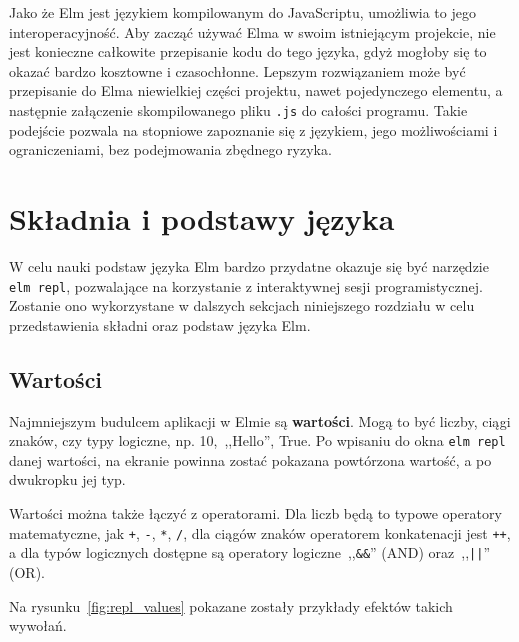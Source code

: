 \documentclass[twoside,a4paper]{report}
\begin{document}
Jako że Elm jest językiem kompilowanym do JavaScriptu, umożliwia to jego interoperacyjność.
Aby zacząć używać Elma w swoim istniejącym projekcie, nie jest konieczne całkowite przepisanie kodu do tego języka, gdyż mogłoby się to okazać bardzo kosztowne i czasochłonne.
Lepszym rozwiązaniem może być przepisanie do Elma niewielkiej części projektu, nawet pojedynczego elementu, a następnie załączenie skompilowanego pliku \texttt{.js} do całości programu.
Takie podejście pozwala na stopniowe zapoznanie się z językiem, jego możliwościami i ograniczeniami, bez podejmowania zbędnego ryzyka.

\section{Składnia i podstawy języka}
W celu nauki podstaw języka Elm bardzo przydatne okazuje się być narzędzie \texttt{elm repl}, pozwalające na korzystanie z interaktywnej sesji programistycznej.
Zostanie ono wykorzystane w dalszych sekcjach niniejszego rozdziału w celu przedstawienia składni oraz podstaw języka Elm.

\subsection{Wartości}
Najmniejszym budulcem aplikacji w Elmie są \textbf{wartości}.
Mogą to być liczby, ciągi znaków, czy typy logiczne, np. 10,~,,Hello'', True.
Po wpisaniu do okna \texttt{elm repl} danej wartości, na ekranie powinna zostać pokazana powtórzona wartość, a po dwukropku jej typ.

Wartości można także łączyć z operatorami.
Dla liczb będą to typowe operatory matematyczne, jak \texttt{+}, \texttt{-}, \texttt{*}, \texttt{/}, dla ciągów znaków operatorem konkatenacji jest \texttt{++}, a dla typów logicznych dostępne są operatory logiczne~,,\texttt{\&\&}'' (AND) oraz~,,\texttt{||}'' (OR).

Na rysunku~\ref{fig:repl_values} pokazane zostały przykłady efektów takich wywołań.
\end{document}
